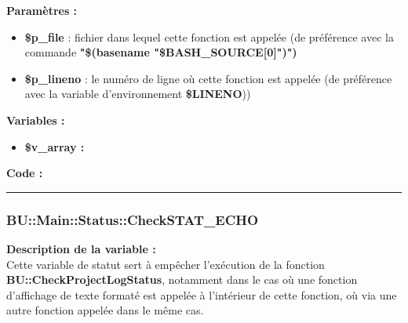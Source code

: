 \documentclass[a4paper,10pt]{article}
\begin{document}
\begin{justify}
    \textbf{Paramètres :}

    \begin{itemize}
        \item \color{orange}\textbf{\$p\_file}\color{white} : fichier dans lequel cette fonction est appelée (de préférence avec la commande \textbf{"\$(\color{gray}basename \color{white}"\color{orange}\$BASH\_SOURCE[0]\color{white}")")}\\

        \item \color{orange}\textbf{\$p\_lineno}\color{white} : le numéro de ligne où cette fonction est appelée (de préférence avec la variable d'environnement \textbf{\color{orange}\$LINENO}))
    \end{itemize}
\end{justify}

\begin{justify}
    \textbf{Variables :}

    \begin{itemize}
        \item \textbf{\color{orange}\$v\_array\color{white} :}
    \end{itemize}
\end{justify}

\begin{justify}
    \textbf{Code :}
\end{justify}




\color{blue}\par\noindent\rule{\textwidth}{0.4pt}\color{white}

\color{blue}
\subsubsection{\color{mauve}BU::Main::Status::CheckSTAT\_ECHO}\color{white}

\begin{justify}
    \textbf{Description de la variable :}\\
    Cette variable de statut sert à empêcher l'exécution de la fonction \textbf{\color{mauve}BU::CheckProjectLogStatus}, notamment dans le cas où une fonction d'affichage de texte formaté est appelée à l'intérieur de cette fonction, où via une autre fonction appelée dans le même cas.
\end{justify}
\end{document}
